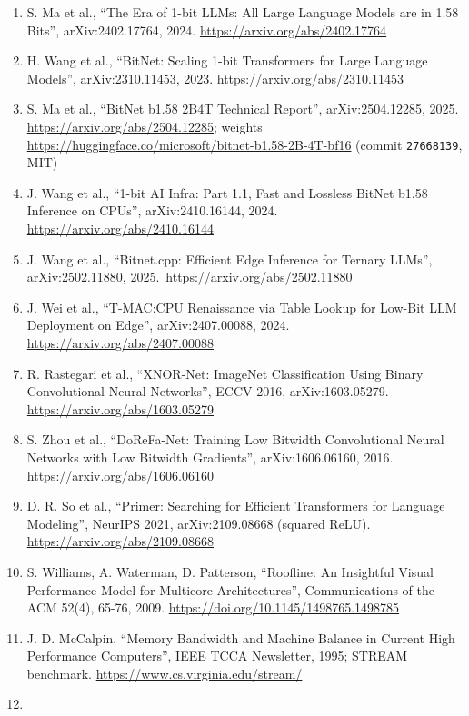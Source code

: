\documentclass[
  10pt,
]{article}
\providecommand{\tightlist}{%
  \setlength{\itemsep}{0pt}\setlength{\parskip}{0pt}}
\begin{document}
\begin{enumerate}
\def\labelenumi{\arabic{enumi}.}
\tightlist%
\item
  S. Ma et al., ``The Era of 1-bit LLMs: All Large Language Models are
  in 1.58 Bits'', arXiv:2402.17764, 2024.
  \url{https://arxiv.org/abs/2402.17764}
\item
  H. Wang et al., ``BitNet: Scaling 1-bit Transformers for Large
  Language Models'', arXiv:2310.11453, 2023.
  \url{https://arxiv.org/abs/2310.11453}
\item
  S. Ma et al., ``BitNet b1.58 2B4T Technical Report'',
  arXiv:2504.12285, 2025.
  \url{https://arxiv.org/abs/2504.12285}; weights
  \url{https://huggingface.co/microsoft/bitnet-b1.58-2B-4T-bf16}
  (commit \texttt{27668139}, MIT)
\item
  J. Wang et al., ``1-bit AI Infra: Part 1.1, Fast and Lossless BitNet
  b1.58 Inference on CPUs'', arXiv:2410.16144, 2024.
  \url{https://arxiv.org/abs/2410.16144}
\item
  J. Wang et al., ``Bitnet.cpp: Efficient Edge Inference for Ternary
  LLMs'', arXiv:2502.11880, 2025.\ \url{https://arxiv.org/abs/2502.11880}
\item
  J. Wei et al., ``T-MAC:\@ CPU Renaissance via Table Lookup for Low-Bit
  LLM Deployment on Edge'', arXiv:2407.00088, 2024.
  \url{https://arxiv.org/abs/2407.00088}
\item
  R. Rastegari et al., ``XNOR-Net: ImageNet Classification Using Binary
  Convolutional Neural Networks'', ECCV 2016, arXiv:1603.05279.
  \url{https://arxiv.org/abs/1603.05279}
\item
  S. Zhou et al., ``DoReFa-Net: Training Low Bitwidth Convolutional
  Neural Networks with Low Bitwidth Gradients'', arXiv:1606.06160, 2016.
  \url{https://arxiv.org/abs/1606.06160}
\item
  D. R. So et al., ``Primer: Searching for Efficient Transformers for
  Language Modeling'', NeurIPS 2021, arXiv:2109.08668 (squared ReLU).
  \url{https://arxiv.org/abs/2109.08668}
\item
  S. Williams, A. Waterman, D. Patterson, ``Roofline: An Insightful
  Visual Performance Model for Multicore Architectures'', Communications
  of the ACM 52(4), 65-76, 2009.
  \url{https://doi.org/10.1145/1498765.1498785}
\item
  J. D. McCalpin, ``Memory Bandwidth and Machine Balance in Current High
  Performance Computers'', IEEE TCCA Newsletter, 1995; STREAM benchmark.
  \url{https://www.cs.virginia.edu/stream/}
\item

\end{enumerate}
\end{document}
